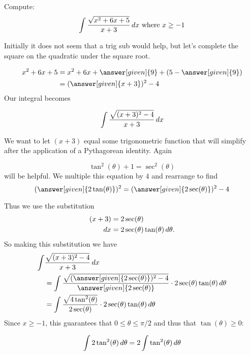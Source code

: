 \documentclass{ximera}
\begin{document}
\begin{example}
  Compute:
  \[
  \int \frac{\sqrt{x^2+6x+5}}{x+3}\mathop{}\!d x \text{ where } x \geq -1
  \]

  \begin{explanation}
  Initially it does not seem that a trig sub would help, but let's complete the square on the quadratic under the square root.

    \begin{align*}
      x^2+6x+5 &= x^2+6x+\answer[given]{9}+(5-\answer[given]{9})\\
      &= (\answer[given]{x+3})^2-4
    \end{align*}
    Our integral becomes

    \[
    \int \frac{\sqrt{(x+3)^2-4}}{x+3}\mathop{}\!d x
    \]

    We want to let $(x+3)$ equal some trigonometric
    function that will simplify after the application of a
    Pythagorean identity. Again 

    \[
    \tan^2(\theta) + 1 = \sec^2(\theta)
    \]
    will be helpful. We multiple this equation by $4$ and rearrange to find
    \[
    (\answer[given]{2\tan(\theta)})^2 = (\answer[given]{2\sec(\theta)})^2 - 4
    \]

    Thus we use the substitution 
    \begin{align*}
      (x+3) &=  2\sec(\theta)\\
      \mathop{}\!d x &= 2\sec(\theta)\tan(\theta) \mathop{}\!d \theta.
    \end{align*}
    So making this substitution we have
    \begin{align*}
      \int &\frac{\sqrt{(x+3)^2-4}}{x+3}\d x \\
      &= \int\frac{\sqrt{(\answer[given]{2\sec(\theta)})^2-4}}{\answer[given]{2\sec(\theta)}} \cdot 2\sec(\theta)\tan(\theta)\d \theta\\
      &= \int\frac{\sqrt{4\tan^{2}(\theta)}}{2\sec(\theta)} \cdot 2\sec(\theta)\tan(\theta)\d \theta\\
    \end{align*}
    Since $x\geq -1$, this guarantees that $0\leq \theta \leq \pi/2$ and thus that 
$\tan(\theta) \geq 0$:

    \[
    \int 2 \tan^2(\theta) \mathop{}\!d \theta = 2\int \tan^2(\theta) \mathop{}\!d \theta
    \]


\end{explanation}
\end{example}
\end{document}
